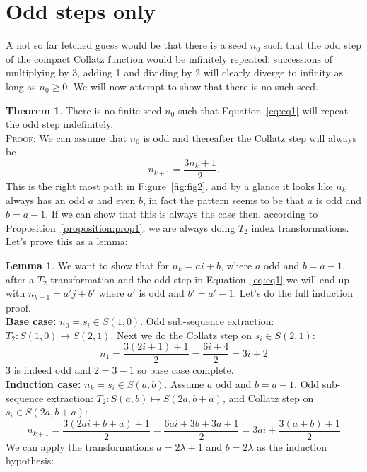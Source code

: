\documentclass{article}
\theoremstyle{definition}
\newtheorem{theorem}{Theorem}[section]
\newtheorem{lemma}{Lemma}[section]
\begin{document}
\section{Odd steps only}
A not so far fetched guess would be that there is a seed $n_0$ such that the odd step of the compact Collatz function would be infinitely repeated: successions of multiplying by 3, adding 1 and dividing by 2 will clearly diverge to infinity as long as $n_0\geq0$. We will now attempt to show that there is no such seed.
%
\begin{theorem}\label{theorem:thm1}
There is no finite seed $n_0$ such that Equation~\ref{eq:eq1} will repeat the odd step indefinitely.
%
\\[.2cm]
%
\textsc{Proof:} We can assume that $n_0$ is odd and thereafter the Collatz step will always be
\begin{equation*}
    n_{k+1} = \frac{3n_k + 1}{2}.
\end{equation*}
This is the right most path in Figure~\ref{fig:fig2}, and by a glance it looks like $n_k$ always has an odd $a$ and even $b$, in fact the pattern seems to be that $a$ is odd and $b=a-1$. If we can show that this is always the case then, according to Proposition~\ref{proposition:prop1}, we are always doing $T_2$ index transformations. Let's prove this as a lemma:
%
\begin{lemma}
We want to show that for $n_k = ai+b$, where $a$ odd and $b=a-1$, after a $T_2$ transformation and the odd step in Equation~\ref{eq:eq1} we will end up with $n_{k+1}=a'j+b'$ where $a'$ is odd and $b'=a'-1$. Let's do the full induction proof.
%
\\[.2cm]
%
\textbf{Base case:} $n_0 = s_i \in S(1,0)$. Odd sub-sequence extraction: $T_2: S(1,0) \longrightarrow S(2,1)$. Next we do the Collatz step on $s_i\in S(2,1)$:
\begin{equation*}
    n_1 = \frac{3(2i+1)+1}{2} = \frac{6i+4}{2} = 3i+2
\end{equation*}
3 is indeed odd and $2=3-1$ so base case complete.
%
\\[.2cm]
%
\textbf{Induction case:} $n_k = s_i \in S(a,b)$. Assume $a$ odd and $b=a-1$. Odd sub-sequence extraction: $T_2: S(a,b) \longmapsto S(2a, b+a)$, and Collatz step on $s_i \in S(2a,b+a)$:
\begin{equation*}
    n_{k+1} = \frac{3(2ai+b+a)+1}{2} = \frac{6ai+3b+3a+1}{2} = 3ai + \frac{3(a+b)+1}{2}
\end{equation*}
We can apply the transformations $a=2\lambda+1$ and $b=2\lambda$ as the induction hypothesis:

\end{lemma}
\end{theorem}
\end{document}
